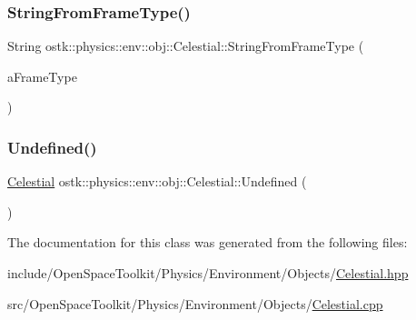 \subsubsection{\texorpdfstring{String\+From\+Frame\+Type()}{StringFromFrameType()}}
{\footnotesize\ttfamily String ostk\+::physics\+::env\+::obj\+::\+Celestial\+::\+String\+From\+Frame\+Type (\begin{DoxyParamCaption}\item[{const \hyperlink{classostk_1_1physics_1_1env_1_1obj_1_1_celestial_ad005258cdc5969759c8a516fb1cfd262}{Celestial\+::\+Frame\+Type} \&}]{a\+Frame\+Type }\end{DoxyParamCaption})\hspace{0.3cm}{\ttfamily [static]}}

\mbox{\label{classostk_1_1physics_1_1env_1_1obj_1_1_celestial_ac27c062b04fa867e79c635dfd21808ca}} 
\subsubsection{\texorpdfstring{Undefined()}{Undefined()}}
{\footnotesize\ttfamily \hyperlink{classostk_1_1physics_1_1env_1_1obj_1_1_celestial}{Celestial} ostk\+::physics\+::env\+::obj\+::\+Celestial\+::\+Undefined (\begin{DoxyParamCaption}{ }\end{DoxyParamCaption})\hspace{0.3cm}{\ttfamily [static]}}



The documentation for this class was generated from the following files\+:\begin{DoxyCompactItemize}
\item 
include/\+Open\+Space\+Toolkit/\+Physics/\+Environment/\+Objects/\hyperlink{_celestial_8hpp}{Celestial.\+hpp}\item 
src/\+Open\+Space\+Toolkit/\+Physics/\+Environment/\+Objects/\hyperlink{_celestial_8cpp}{Celestial.\+cpp}\end{DoxyCompactItemize}

